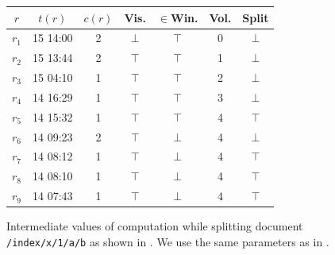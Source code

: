 \documentclass[abstracton,12pt]{scrartcl}
\theoremstyle{definition}
\begin{document}
\begin{figure}
    \begin{center}
        \begin{footnotesize}
            \begin{tabular}{|c|c|c|c|c|c|c|} 
                \hline
                $r$     & $t(r)$ &    $c(r)$ &        Vis. &      $\in$Win. &         Vol. &      Split \\
                \hline
                $r_1$ & 15 14:00 &  2 &             $\bot$ &         $\top$ &                 0 &                 $\bot$ \\ 
                \hline
                $r_2$ & 15 13:44 &  2 &             $\top$ &         $\top$ &                 1 &                 $\bot$ \\
                \hline
                $r_3$ & 15 04:10 &  1 &             $\top$ &         $\top$ &                 2 &                 $\bot$ \\
                \hline
                $r_4$ & 14 16:29 &  1 &             $\top$ &         $\top$ &                 3 &                 $\bot$ \\
                \hline
                $r_5$ & 14 15:32 &  1 &             $\top$ &         $\top$ &                 4 &                 $\top$ \\
                \hline
                $r_6$ & 14 09:23 &  2 &             $\top$ &         $\bot$ &                 4 &                 $\bot$ \\
                \hline
                $r_7$ & 14 08:12 &  1 &             $\top$ &         $\bot$ &                 4 &                 $\top$ \\
                \hline
                $r_8$ & 14 08:10 &  1 &             $\top$ &         $\bot$ &                 4 &                 $\top$ \\
                \hline
                $r_9$ & 14 07:43 &  1 &             $\top$ &         $\bot$ &                 4 &                 $\top$ \\
                \hline
            \end{tabular}
        \end{footnotesize}
    \end{center}
    \caption{
        Intermediate values of computation while splitting document \texttt{/index/x/1/a/b} as shown in .
        We use the same parameters as in .
    }
    \label{fig:split_doc_debug}
\end{figure}
\end{document}
